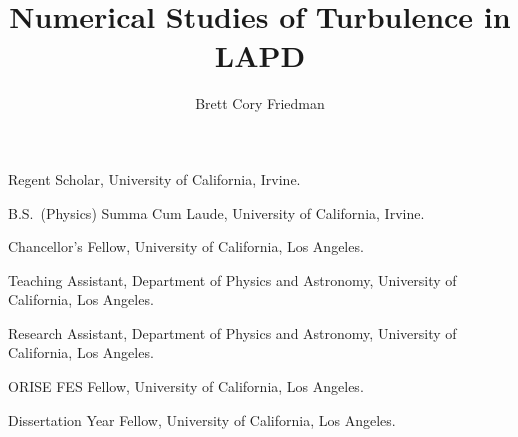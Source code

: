 \title          {Numerical Studies of Turbulence in LAPD}
\author         {Brett Cory Friedman}




\dedication     {\textsl{To be completed \ldots \\}}
                




                {Regent Scholar, University of California, Irvine.}

                {B.S.~(Physics) Summa Cum Laude, University of California, Irvine.}

                {Chancellor's Fellow, University of California, Los Angeles.}

                {Teaching Assistant, Department of Physics and Astronomy, University of California, Los Angeles.}

                {Research Assistant, Department of Physics and Astronomy, University of California, Los Angeles.}

                {ORISE FES Fellow, University of California, Los Angeles.}

                {Dissertation Year Fellow, University of California, Los Angeles.}





